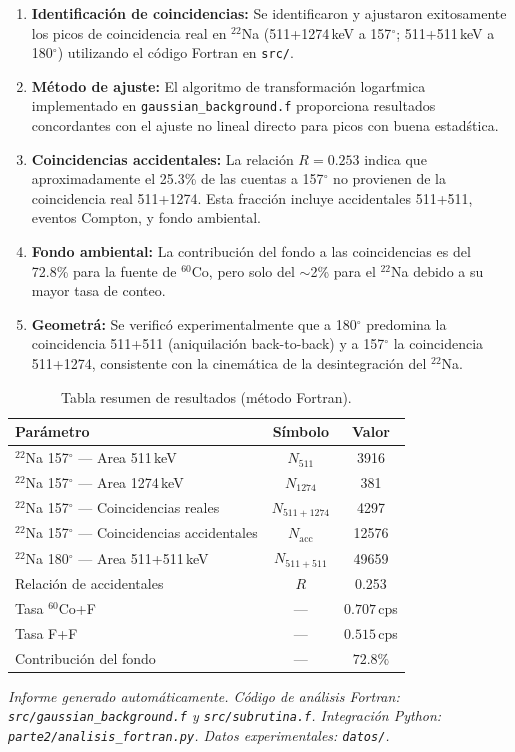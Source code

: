 \documentclass[12pt,a4paper]{article}
\begin{document}
\begin{enumerate}
  \item \textbf{Identificaci\'on de coincidencias:} Se identificaron y ajustaron
        exitosamente los picos de coincidencia real en $^{22}$Na (511+1274\,keV a 157$^\circ$;
        511+511\,keV a 180$^\circ$) utilizando el c\'odigo Fortran en \texttt{src/}.
  \item \textbf{M\'etodo de ajuste:} El algoritmo de transformaci\'on logar\'tmica
        implementado en \texttt{gaussian\_background.f} proporciona resultados concordantes
        con el ajuste no lineal directo para picos con buena estad\'stica.
  \item \textbf{Coincidencias accidentales:} La relaci\'on $R = 0.253$ indica que
        aproximadamente el 25.3\% de las cuentas a 157$^\circ$ no provienen de la
        coincidencia real 511+1274. Esta fracci\'on incluye accidentales 511+511,
        eventos Compton, y fondo ambiental.
  \item \textbf{Fondo ambiental:} La contribuci\'on del fondo a las coincidencias es del
        72.8\% para la fuente de $^{60}$Co, pero solo del $\sim$2\% para el $^{22}$Na
        debido a su mayor tasa de conteo.
  \item \textbf{Geometr\'a:} Se verific\'o experimentalmente que a 180$^\circ$ predomina
        la coincidencia 511+511 (aniquilaci\'on back-to-back) y a 157$^\circ$ la
        coincidencia 511+1274, consistente con la cinem\'atica de la desintegraci\'on
        del $^{22}$Na.
\end{enumerate}

\begin{table}[htbp]
\centering
\caption{Tabla resumen de resultados (m\'etodo Fortran).}
\label{tab:resumen_final}
\begin{tabular}{lcc}
\hline \hline
Par\'ametro & S\'imbolo & Valor \\
\hline
$^{22}$Na 157$^\circ$ --- Area 511\,keV & $N_{511}$ & 3916 \\
$^{22}$Na 157$^\circ$ --- Area 1274\,keV & $N_{1274}$ & 381 \\
$^{22}$Na 157$^\circ$ --- Coincidencias reales & $N_{511+1274}$ & 4297 \\
$^{22}$Na 157$^\circ$ --- Coincidencias accidentales & $N_{\text{acc}}$ & 12576 \\
$^{22}$Na 180$^\circ$ --- Area 511+511\,keV & $N_{511+511}$ & 49659 \\
Relaci\'on de accidentales & $R$ & 0.253 \\
Tasa $^{60}$Co+F & --- & $0.707$\,cps \\
Tasa F+F & --- & $0.515$\,cps \\
Contribuci\'on del fondo & --- & $72.8\%$ \\
\hline
\end{tabular}
\end{table}

\vfill
\noindent\small\textit{Informe generado autom\'aticamente. C\'odigo de an\'alisis Fortran: \texttt{src/gaussian\_background.f} y \texttt{src/subrutina.f}. Integraci\'on Python: \texttt{parte2/analisis\_fortran.py}. Datos experimentales: \texttt{datos/}.}
\end{document}

